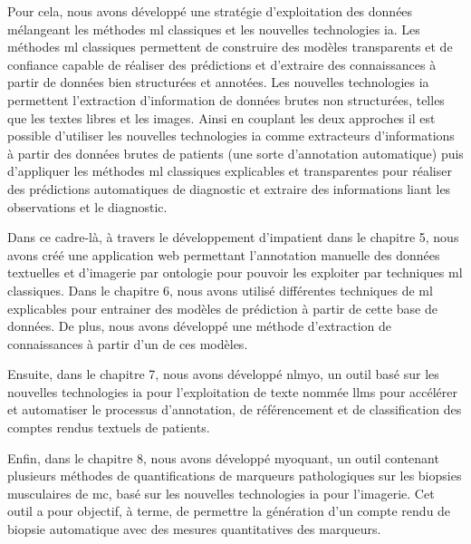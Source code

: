 Pour cela, nous avons développé une stratégie d'exploitation des données mélangeant les méthodes \gls{ml} classiques et les nouvelles technologies \gls{ia}. Les méthodes \gls{ml} classiques permettent de construire des modèles transparents et de confiance capable de réaliser des prédictions et d'extraire des connaissances à partir de données bien structurées et annotées. Les nouvelles technologies \gls{ia} permettent l'extraction d'information de données brutes non structurées, telles que les textes libres et les images. Ainsi en couplant les deux approches il est possible d'utiliser les nouvelles technologies \gls{ia} comme extracteurs d'informations à partir des données brutes de patients (une sorte d'annotation automatique) puis d'appliquer les méthodes \gls{ml} classiques explicables et transparentes pour réaliser des prédictions automatiques de diagnostic et extraire des informations liant les observations et le diagnostic.

Dans ce cadre-là, à travers le développement d'\gls{impatient} dans le chapitre 5, nous avons créé une application web permettant l'annotation manuelle des données textuelles et d'imagerie par ontologie pour pouvoir les exploiter par techniques \gls{ml} classiques. Dans le chapitre 6, nous avons utilisé différentes techniques de \gls{ml} explicables pour entrainer des modèles de prédiction à partir de cette base de données. De plus, nous avons développé une méthode d'extraction de connaissances à partir d'un de ces modèles. 

Ensuite, dans le chapitre 7, nous avons développé \gls{nlmyo}, un outil basé sur les nouvelles technologies \gls{ia} pour l'exploitation de texte nommée \gls{llms} pour accélérer et automatiser le processus d'annotation, de référencement et de classification des comptes rendus textuels de patients.

Enfin, dans le chapitre 8, nous avons développé \gls{myoquant}, un outil contenant plusieurs méthodes de quantifications de marqueurs pathologiques sur les biopsies musculaires de \gls{mc}, basé sur les nouvelles technologies \gls{ia} pour l'imagerie. Cet outil a pour objectif, à terme, de permettre la génération d'un compte rendu de biopsie automatique avec des mesures quantitatives des marqueurs.